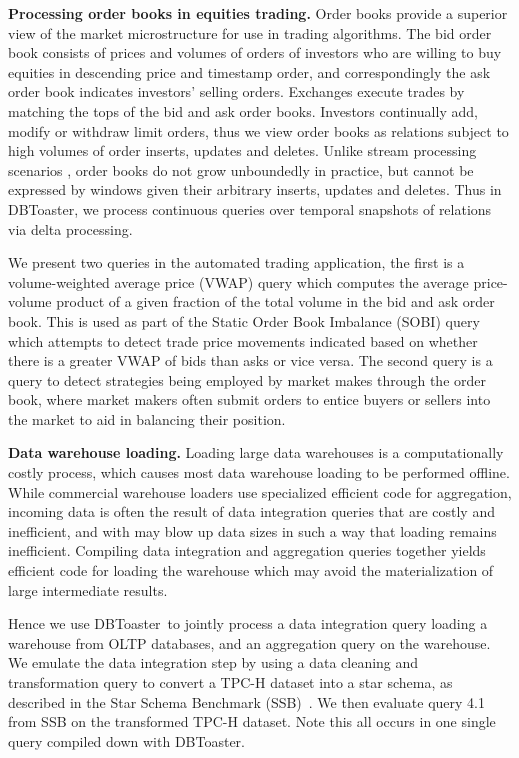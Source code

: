 \documentclass{vldb}
\newcommand{\compiler}{DBToaster}
\begin{document}
\textbf{Processing order books in equities trading.}
Order books provide a superior view of the market microstructure for use in
trading algorithms. The bid order book consists of prices and volumes of orders
of investors who are willing to buy equities in descending price and timestamp
order, and correspondingly the ask order book indicates investors' selling
orders. Exchanges execute trades by matching the tops of the bid and ask order
books. Investors continually add, modify or withdraw limit orders, thus we view
order books as relations subject to high volumes of order inserts, updates and
deletes. Unlike stream processing scenarios \cite{motwani-cidr:03}, order
books do not grow unboundedly in practice, but cannot be expressed by windows
given their arbitrary inserts, updates and deletes. Thus in \compiler, we process
continuous queries over temporal snapshots of relations via delta processing.

We present two queries in the automated trading application, the first is a
volume-weighted average price (VWAP) query which computes the average
price-volume product of a given fraction of the total volume in the bid and
ask order book. This is used as part of the Static Order Book Imbalance (SOBI)
query which attempts to detect trade price movements indicated based on whether
there is a greater VWAP of bids than asks or vice versa. The second query is a
query to detect strategies being employed by market makes through the order
book, where market makers often submit orders to entice buyers or sellers into
the market to aid in balancing their position.

\textbf{Data warehouse loading.}
Loading large data warehouses is a computationally costly process, which
causes most data warehouse loading to be performed offline.
While commercial warehouse loaders use specialized efficient code for 
aggregation, incoming data is often the result of data integration
queries that are costly and inefficient, and with may blow up data sizes
in such a way that loading remains inefficient.
Compiling data integration and aggregation queries together yields efficient
code for loading the warehouse which may avoid the materialization of large
intermediate results.

Hence we use \compiler\ to jointly process a data integration query loading a
warehouse from OLTP databases, and an aggregation query on the warehouse. We
emulate the data integration step by using a data cleaning and transformation
query to convert a TPC-H dataset into a star schema, as described in the Star
Schema Benchmark (SSB)~\cite{poneil-ssb:07}. We then evaluate query 4.1 from SSB
on the transformed TPC-H dataset. Note this all occurs in one single query
compiled down with \compiler.
\end{document}
